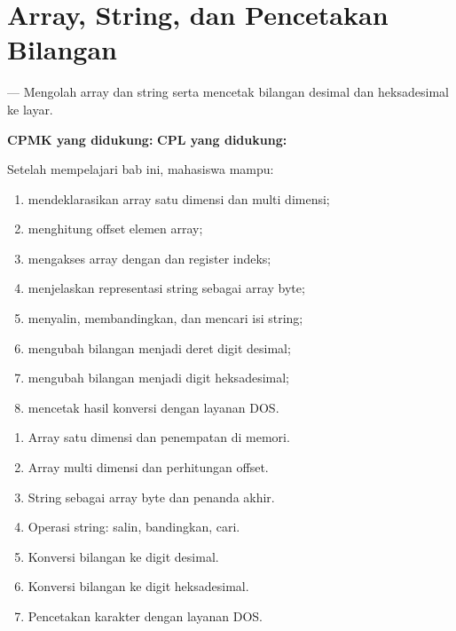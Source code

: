 \documentclass[../../main.tex]{subfiles}
\begin{document}
\chapter{Array, String, dan Pencetakan Bilangan}
\label{chap:array-string}


\begin{subcpmkbox}
\vspace{1.1em}
 --- Mengolah array dan string serta mencetak bilangan
desimal dan heksadesimal ke layar.

\vspace{0.4em}
\textbf{CPMK yang didukung:}  \quad\textbullet\quad
\textbf{CPL yang didukung:} 
\end{subcpmkbox}

\begin{tujuanbox}
\vspace{1.1em}
Setelah mempelajari bab ini, mahasiswa mampu:
\begin{enumerate}
    \item mendeklarasikan array satu dimensi dan multi dimensi;
    \item menghitung offset elemen array;
    \item mengakses array dengan  dan register indeks;
    \item menjelaskan representasi string sebagai array byte;
    \item menyalin, membandingkan, dan mencari isi string;
    \item mengubah bilangan menjadi deret digit desimal;
    \item mengubah bilangan menjadi digit heksadesimal;
    \item mencetak hasil konversi dengan layanan DOS.
\end{enumerate}
\end{tujuanbox}

\begin{materibox}
\vspace{1.1em}
\begin{enumerate}
    \item Array satu dimensi dan penempatan di memori.
    \item Array multi dimensi dan perhitungan offset.
    \item String sebagai array byte dan penanda akhir.
    \item Operasi string: salin, bandingkan, cari.
    \item Konversi bilangan ke digit desimal.
    \item Konversi bilangan ke digit heksadesimal.
    \item Pencetakan karakter dengan layanan DOS.
\end{enumerate}
\end{materibox}










\end{document}
